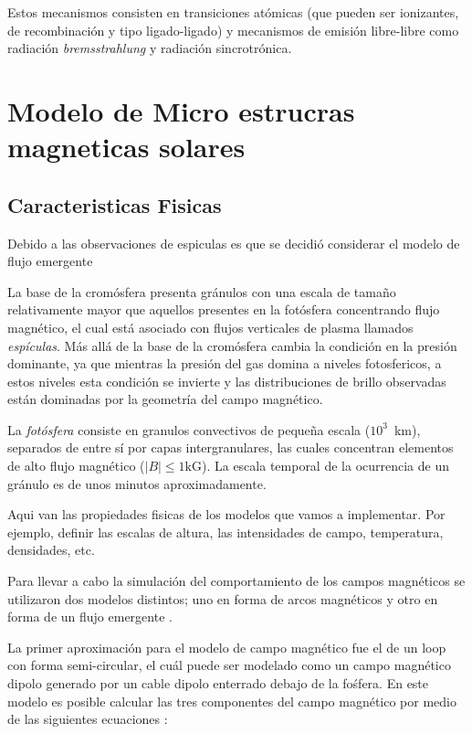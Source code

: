 \documentclass[9pt]{book}
\begin{document}
Estos mecanismos consisten en transiciones at\'omicas (que pueden ser ionizantes, de recombinaci\'on y tipo ligado-ligado) y mecanismos de emisi\'on libre-libre como radiaci\'on \emph{bremsstrahlung} y radiaci\'on sincrotr\'onica.

  
\chapter{Modelo de Micro estrucras magneticas solares}
\section{Caracteristicas Fisicas}


Debido a las observaciones de espiculas es que se decidi\'o considerar el modelo de flujo emergente

La base de la crom\'osfera presenta gr\'anulos con una escala de tama\~no relativamente mayor que aquellos presentes en la fot\'osfera concentrando flujo magn\'etico, el cual est\'a asociado con flujos verticales de plasma llamados \emph{esp\'iculas}. M\'as all\'a de la base de la crom\'osfera cambia la condici\'on en la presi\'on dominante, ya que mientras la presi\'on del gas domina a niveles fotosfericos, a estos niveles esta condici\'on se invierte y las distribuciones de brillo observadas est\'an dominadas por la geometr\'ia del campo magn\'etico.

La \emph{fot\'osfera}  consiste en granulos convectivos de peque\~na escala ($10^3$~km), separados de entre s\'i por capas intergranulares, las cuales concentran elementos de alto flujo magn\'etico ($|B| \le 1\mbox{kG}$). La escala temporal de la ocurrencia de un gr\'anulo es de unos minutos aproximadamente.



Aqui van las propiedades fisicas de los modelos que vamos a implementar. Por ejemplo, definir las escalas de altura, las intensidades de campo, temperatura, densidades, etc.

Para llevar a cabo la simulaci\'on del comportamiento de los campos magn\'eticos se utilizaron dos modelos distintos; uno en forma de arcos magn\'eticos \cite{loops} y otro en forma de un flujo emergente \cite{flujoemergente}.

La primer aproximaci\'on para el modelo de campo magn\'etico fue el de un loop con forma semi-circular, el cu\'al puede ser modelado como un campo magn\'etico dipolo generado por un cable dipolo enterrado debajo de la fo\'sfera.
En este modelo es posible calcular las tres componentes del campo magn\'etico por medio de las siguientes ecuaciones :
\end{document}
